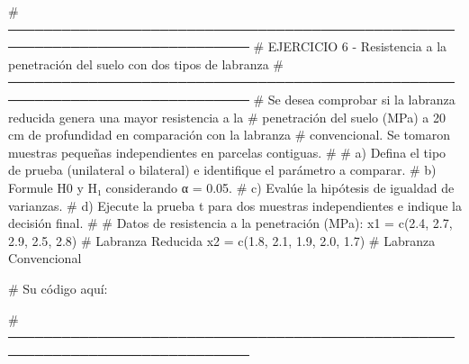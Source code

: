 \documentclass[
  spanish,
  letterpaper,
  DIV=11,
  numbers=noendperiod]{scrreprt}
\newenvironment{Shaded}{\begin{snugshade}}{\end{snugshade}}
\newcommand{\CommentTok}[1]{\textcolor[rgb]{0.37,0.37,0.37}{#1}}
\newcommand{\FloatTok}[1]{\textcolor[rgb]{0.68,0.00,0.00}{#1}}
\newcommand{\FunctionTok}[1]{\textcolor[rgb]{0.28,0.35,0.67}{#1}}
\newcommand{\NormalTok}[1]{\textcolor[rgb]{0.00,0.23,0.31}{#1}}
\newcommand{\OtherTok}[1]{\textcolor[rgb]{0.00,0.23,0.31}{#1}}
\begin{document}
\begin{Shaded}
\begin{Highlighting}[]
\CommentTok{\# ─────────────────────────────────────────────────────────────────────────────}
\CommentTok{\# EJERCICIO 6 {-} Resistencia a la penetración del suelo con dos tipos de labranza}
\CommentTok{\# ─────────────────────────────────────────────────────────────────────────────}
\CommentTok{\# Se desea comprobar si la labranza reducida genera una mayor resistencia a la}
\CommentTok{\# penetración del suelo (MPa) a 20 cm de profundidad en comparación con la labranza}
\CommentTok{\# convencional. Se tomaron muestras pequeñas independientes en parcelas contiguas.}
\CommentTok{\#}
\CommentTok{\# a) Defina el tipo de prueba (unilateral o bilateral) e identifique el parámetro a comparar.}
\CommentTok{\# b) Formule H0 y H₁ considerando α = 0.05.}
\CommentTok{\# c) Evalúe la hipótesis de igualdad de varianzas.}
\CommentTok{\# d) Ejecute la prueba t para dos muestras independientes e indique la decisión final.}
\CommentTok{\#}
\CommentTok{\# Datos de resistencia a la penetración (MPa):}
\NormalTok{x1 }\OtherTok{=} \FunctionTok{c}\NormalTok{(}\FloatTok{2.4}\NormalTok{, }\FloatTok{2.7}\NormalTok{, }\FloatTok{2.9}\NormalTok{, }\FloatTok{2.5}\NormalTok{, }\FloatTok{2.8}\NormalTok{)   }\CommentTok{\# Labranza Reducida}
\NormalTok{x2 }\OtherTok{=} \FunctionTok{c}\NormalTok{(}\FloatTok{1.8}\NormalTok{, }\FloatTok{2.1}\NormalTok{, }\FloatTok{1.9}\NormalTok{, }\FloatTok{2.0}\NormalTok{, }\FloatTok{1.7}\NormalTok{)   }\CommentTok{\# Labranza Convencional}

\CommentTok{\# Su código aquí:}

\CommentTok{\# ─────────────────────────────────────────────────────────────────────────────}



\end{Highlighting}
\end{Shaded}
\end{document}
